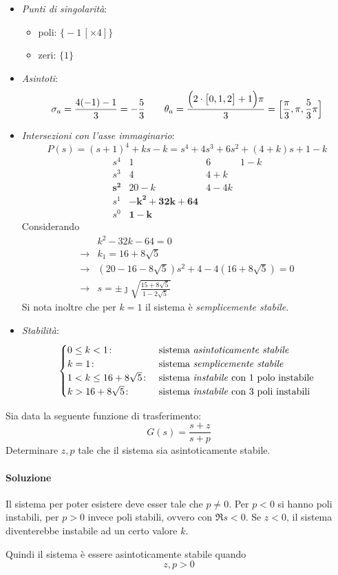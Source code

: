 \begin{esercizio}
\begin{itemize}
	\item \emph{Punti di singolarità}:
		\begin{itemize}
			\item poli: \(\bigl\{-1\,[\times 4]\bigr\}\)
			\item zeri: \(\bigl\{1\bigr\}\)
		\end{itemize}
	\item \emph{Asintoti}:
		\[
			\sigma_a = \frac{4(-1)-1}{3} = -\frac{5}{3} \qquad
			\theta_a = \frac{\Bigl(2\cdot\bigl[0,1,2\bigr]+1\Bigr)\pi}{3} = \Bigl[\frac{\pi}{3},\pi,\frac{5}{3}\pi\Bigr]
		\]
	\item \emph{Intersezioni con l'asse immaginario}:
		\[
			P(s) = (s+1)^4 +ks -k = s^4+4s^3+6s^2+(4+k)s+1-k
		\]
		\[\begin{array}{r|rrr}
			s^4 & 1 & 6 & 1-k \\
			s^3 & 4 & 4+k \\
			\bm{s^2} & 20-k & 4-4k \\
			s^1 & \bm{-k^2+32k+64} \\
			s^0 & \bm{1-k}
		\end{array}\]
		Considerando
		\begin{align*}
			& k^2-32k-64=0 \\
			\rightarrow & k_1 = 16+8\sqrt{5} \\
			\rightarrow & (20-16-8\sqrt{5})s^2 +4-4(16+8\sqrt{5}) =0 \\
			\rightarrow & s=\pm\jmath\sqrt{\frac{15+8\sqrt{5}}{1-2\sqrt{5}}}
		\end{align*}
		Si nota inoltre che per \(k=1\) il sistema è \emph{semplicemente stabile}.
	\item \emph{Stabilità}:
		\[\begin{cases}
			0 \leq k < 1\colon & \text{sistema \emph{asintoticamente stabile}} \\
			k = 1\colon & \text{sistema \emph{semplicemente stabile}} \\
			1 < k \leq 16+8\sqrt{5}\colon & \text{sistema \emph{instabile} con 1 polo instabile} \\
			k > 16+8\sqrt{5}\colon & \text{sistema \emph{instabile} con 3 poli instabili}
		\end{cases}\]
\end{itemize}
\end{esercizio}

\begin{esercizio}
Sia data la seguente funzione di trasferimento:
\[
	G(s) = \frac{s+z}{s+p}
\]
Determinare \(z,p\) tale che il sistema sia asintoticamente stabile.

\paragraph{Soluzione}
Il sistema per poter esistere deve esser tale che \(p\neq0\).
Per \(p<0\) si hanno poli instabili, per \(p>0\) invece poli stabili, ovvero con
\(\Re s<0\).
Se \(z<0\), il sistema diventerebbe instabile ad un certo valore \(k\).

Quindi il sistema è essere asintoticamente stabile quando
\[
	z,p > 0
\]
\end{esercizio}

